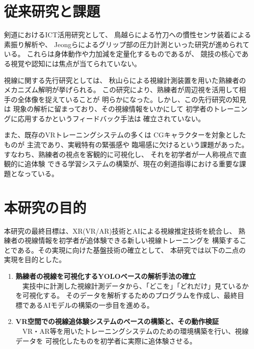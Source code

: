 \documentclass[dvipdfmx]{ujreport}
\begin{document}
\section{従来研究と課題}
    剣道におけるICT活用研究として、
    鳥越ら\cite{torigoe}による竹刀への慣性センサ装着による素振り解析や、
    Jeongら\cite{jeong}によるグリップ部の圧力計測といった研究が進められている。
    これらは身体動作や力加減を定量化するものであるが、
    競技の核心である視覚や認知には焦点が当てられていない。

    視線に関する先行研究としては、
    秋山らによる視線計測装置を用いた熟練者の
    メカニズム解明\cite{akiyama}が挙げられる。
    この研究により、熟練者が周辺視を活用して相手の全体像を捉えていることが
    明らかになった。しかし、この先行研究の知見は
    現象の解析に留まっており、その視線情報をいかにして
    初学者のトレーニングに応用するかというフィードバック手法は
    確立されていない。

    また、既存のVRトレーニングシステムの多くは
    CGキャラクターを対象としたものが
    主流であり、実戦特有の緊張感や
    臨場感に欠けるという課題があった。すなわち、熟練者の視点を客観的に可視化し、
    それを初学者が一人称視点で直観的に追体験
    できる学習システムの構築が、現在の剣道指導における重要な課題となっている。

\section{本研究の目的}
    本研究の最終目標は、XR(VR/AR)技術とAIによる視線推定技術を統合し、
    熟練者の視線情報を初学者が追体験できる新しい視線トレーニングを
    構築することである。その実現に向けた基盤技術の確立として、
    本研究では以下の二点の実現を目的とした。

    \begin{enumerate}
        \item \textbf{熟練者の視線を可視化するYOLOベースの解析手法の確立} \\
        　実技中に計測した視線計測データから、「どこを」「どれだけ」見ているかを可視化する。
        そのデータを解析するためのプログラムを作成し、最終目標であるAIモデルの構築の一歩目を進める。

        \item \textbf{VR空間での視線追体験システムのベースの構築と、その動作検証} \\
        　VR・AR等を用いたトレーニングシステムのための環境構築を行い、視線データを
        可視化したものを初学者に実際に追体験させる。

    \end{enumerate}
\end{document}
